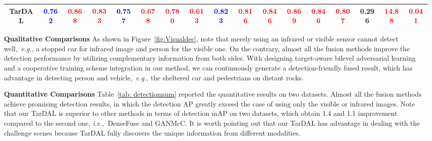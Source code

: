 \documentclass[10pt,twocolumn,letterpaper]{article}
\begin{document}
\begin{table*}[!htb]
\begin{tabular}{|c|cccccc|c|ccccc|c|ccc|}
		\footnotesize TarDAL&\footnotesize\textcolor{blue}{\textbf{0.762}}&\footnotesize \textcolor{red}{\textbf{0.868}}&\footnotesize \textcolor{red}{\textbf{0.833}}&\footnotesize  \textcolor{blue}{\textbf{0.757}} &\footnotesize \textcolor{red}{\textbf{0.678}}&\footnotesize \textcolor{red}{\textbf{0.780}}&\footnotesize \textcolor{red}{\textbf{0.613}}&\footnotesize \textcolor{blue}{\textbf{0.823}}&\footnotesize \textcolor{red}{\textbf{0.816}}&\footnotesize \textcolor{red}{\textbf{0.846}}&\footnotesize \textcolor{red}{\textbf{0.869}} &\footnotesize \textcolor{red}{\textbf{0.846}}&\footnotesize \textcolor{red}{\textbf{0.807}} &\footnotesize 0.296 &\footnotesize \textcolor{red}{\textbf{14.88}} &\footnotesize \textcolor{red}{\textbf{0.041}}\\
		\hline 
	\end{tabular}
	\caption{Quantitative results of object detection on the Multispectral and MFD datasets among all the image fusion method + detector (YOLOv5). The best result is in {\textcolor{red}{\textbf{red}}} whereas the second best one is in {\textcolor{blue}{\textbf{blue}}}.}
	\label{tab: detectionnum}
\end{table*}
\noindent\textbf{Qualitative Comparisons} 
As shown in Figure~\ref{fig:Visualdec}, note that merely using an infrared or visible sensor cannot detect well,~\emph{e.g.,} a stopped car for infrared image and person for the visible one. On the contrary, almost all the fusion methods improve the detection performance by utilizing complementary information from both sides. With designing target-aware bilevel adversarial learning and a cooperative training scheme integration in our method, we can continuously generate a detection-friendly fused result, which has advantage in detecting person and vehicle,~\emph{e.g.,} the sheltered car and pedestrians on distant rocks.

\noindent\textbf{Quantitative Comparisons} 
Table~\ref{tab: detectionnum} reported the quantitative results on two datasets. Almost all the fusion methods achieve promising detection results, in which the detection AP greatly exceed the case of using only the visible or infrared images. Note that our TarDAL is superior to other methods in terms of detection mAP on two datasets, which obtain 1.4 and 1.1 improvement compared to the second one, \emph{i.e.,}~DenseFuse and GANMcC. It is worth pointing out that our TarDAL has advantage in dealing with the challenge scenes because TarDAL fully discovers the unique information from different modalities.
\end{document}
